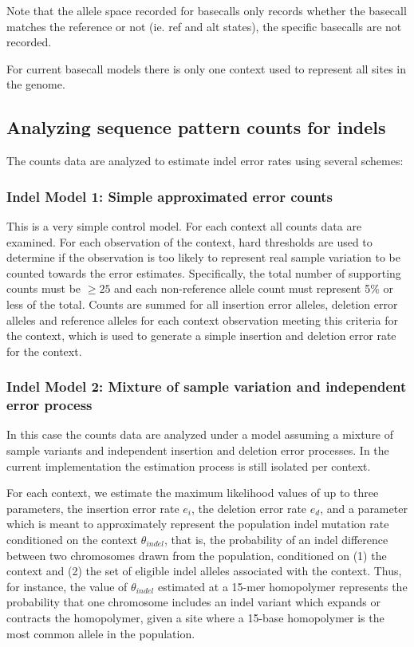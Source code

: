 \documentclass{article}
\begin{document}
Note that the allele space recorded for basecalls only records whether the basecall matches the reference or not (ie. ref and alt states), the specific basecalls are not recorded.

For current basecall models there is only one context used to represent all sites in the genome.

\subsection{Analyzing sequence pattern counts for indels}

The counts data are analyzed to estimate indel error rates using several schemes:

\subsubsection{Indel Model 1: Simple approximated error counts}

This is a very simple control model. For each context all counts data are examined. For each observation of the context, hard thresholds are used to determine if the observation is too likely to represent real sample variation to be counted towards the error estimates. Specifically, the total number of supporting counts must be $\geq 25$ and each non-reference allele count must represent 5\% or less of the total. Counts are summed for all insertion error alleles, deletion error alleles and reference alleles for each context observation meeting this criteria for the context, which is used to generate a simple insertion and deletion error rate for the context.

\subsubsection{Indel Model 2: Mixture of sample variation and independent error process}

In this case the counts data are analyzed under a model assuming a mixture of sample variants and independent insertion and deletion error processes. In the current implementation the estimation process is still isolated per context.

For each context, we estimate the maximum likelihood values of up to three parameters, the insertion error rate $e_i$, the deletion error rate $e_d$, and a parameter which is meant to approximately represent the population indel mutation rate conditioned on the context $\theta_{indel}$, that is, the probability of an indel difference between two chromosomes drawn from the population, conditioned on (1) the context and (2) the set of eligible indel alleles associated with the context. Thus, for instance, the value of $\theta_{indel}$ estimated at a 15-mer homopolymer represents the probability that one chromosome includes an indel variant which expands or contracts the homopolymer, given a site where a 15-base homopolymer is the most common allele in the population.
\end{document}
